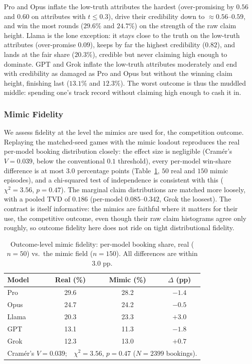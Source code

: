 \documentclass[conference]{IEEEtran}
\begin{document}
Pro and Opus inflate the low-truth attributes the hardest (over-promising by $0.56$ and $0.60$ on attributes with $t\le0.3$), drive their credibility down to $\approx0.56$--$0.59$, and win the most rounds ($29.6\%$ and $24.7\%$) on the strength of the raw claim height. Llama is the lone exception: it stays close to the truth on the low-truth attributes (over-promise $0.09$), keeps by far the highest credibility ($0.82$), and lands at the fair share ($20.3\%$), credible but never claiming high enough to dominate. GPT and Grok inflate the low-truth attributes moderately and end with credibility as damaged as Pro and Opus but without the winning claim height, finishing last ($13.1\%$ and $12.3\%$). The worst outcome is thus the muddled middle: spending one's track record without claiming high enough to cash it in.

\subsubsection{Mimic Fidelity}
\label{sec:dec5-fidelity}
We assess fidelity at the level the mimics are used for, the competition outcome. Replaying the matched-seed games with the mimic loadout reproduces the real per-model booking distribution closely: the effect size is negligible (Cram\'er's $V = 0.039$, below the conventional $0.1$ threshold), every per-model win-share difference is at most $3.0$ percentage points (Table~\ref{tab:dec5_fidelity}, $50$ real and $150$ mimic episodes), and a chi-squared test of independence is consistent with this ($\chi^2 = 3.56$, $p = 0.47$). The marginal claim distributions are matched more loosely, with a pooled TVD of $0.186$ (per-model $0.085$--$0.342$, Grok the loosest). The contrast is itself informative: the mimics are faithful where it matters for their use, the competitive outcome, even though their raw claim histograms agree only roughly, so outcome fidelity here does not ride on tight distributional fidelity.

\begin{table}[htbp]
\caption{Outcome-level mimic fidelity: per-model booking share, real ($n=50$) vs.\ the mimic field ($n=150$). All differences are within $3.0$ pp.}
\label{tab:dec5_fidelity}
\centering
\begin{tabular}{lccc}
\hline
Model & Real (\%) & Mimic (\%) & $\Delta$ (pp) \\
\hline
Pro   & 29.6 & 28.2 & $-1.4$ \\
Opus  & 24.7 & 24.2 & $-0.5$ \\
Llama & 20.3 & 23.3 & $+3.0$ \\
GPT   & 13.1 & 11.3 & $-1.8$ \\
Grok  & 12.3 & 13.0 & $+0.7$ \\
\hline
\multicolumn{4}{l}{Cram\'er's $V = 0.039$;\ \ $\chi^2 = 3.56$, $p = 0.47$ ($N=2399$ bookings).} \\
\hline
\end{tabular}
\end{table}
\end{document}
